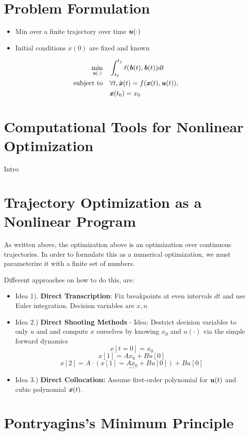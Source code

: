 \section{Problem Formulation}
\begin{itemize}
\item Min over a finite trajectory over time $\bm{\mathit{u}}(\cdot)$
\item Initial conditions $x(0)$ are fixed and known
\end{itemize}
\begin{align*}
\min_{\bm{\mathit{u}}(\cdot)} \quad &
\int_{t_0}^{t_f} \ell(\bm{\mathit{b}}(t),\bm{\mathit{b}}(t)) dt \\ \text{subject to} \quad &
\forall t, \dot{\bm{\mathit{x}}}(t)=f(\bm{\mathit{x}}(t),\bm{\mathit{u}}(t)), \\
& \bm{\mathit{x}}(t_0)=x_0
\end{align*}


\section{Computational Tools for Nonlinear Optimization}
Intro 
\section{Trajectory Optimization as a Nonlinear Program}
As written above, the optimization above is an optimization over continuous trajectories. In order to formulate this as a numerical optimization, we must parameterize it with a finite set of numbers. 

Different approaches on how to do this, are:
\begin{itemize}
\item Idea 1). \textbf{Direct Transcription}: Fix breakpoints at even intervals $dt$ and use Euler integration. Decision variables are $x,n$ 
\item Idea 2.) \textbf{Direct Shooting Methods} - Idea: Destrict decision variables to only $u$ and and compute $x$ ourselves by knowing $x_0$ and $u(\cdot)$ via the simple forward dynamics
$$x[t=0] = x_0$$
$$x[1]=Ax_0+Bu[0]$$
$$x[2]=A\cdot(x[1]=Ax_0+Bu[0])+Bu[0]$$
$$...$$
\item Idea 3.) \textbf{Direct Collocation:} Assume first-order polynomial for $\bm{\mathit{u}}(t)$ and cubic polynomial $\bm{\mathit{x}}(t)$.
\end{itemize}


\section{Pontryagins's Minimum Principle}


